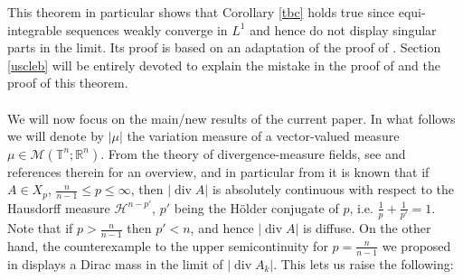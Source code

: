 \documentclass[10pt,reqno]{amsart}
\numberwithin{equation}{section}
\newcommand{\R}{\mathbb{R}}
\newcommand{\T}{\mathbb{T}}
\DeclareMathOperator{\dv}{div}
\theoremstyle{plain}
\theoremstyle{definition}
\theoremstyle{remark}
\begin{document}
This theorem in particular shows that Corollary \ref{tbc} holds true since equi-integrable sequences weakly converge in $L^1$ and hence do not display singular parts in the limit. Its proof is based on an adaptation of the proof of \cite[Thm. 2]{USC}.  Section \ref{uscleb} will be entirely devoted to explain the mistake in the proof of \cite[Cor. 7]{USC} and the proof of this theorem.
\\
\\
We will now focus on the main/new results of the current paper.  In what follows we will denote by $|\mu|$ the  variation measure of a vector-valued measure $\mu\in \mathcal{M}(\T^n;\R^n)$. From the theory of divergence-measure fields, see \cite{DMCT} and references therein for an overview, and in particular from \cite[Thm. 3.2]{Sil05} it is known that if $A\in X_p$, $\frac{n}{n-1}\leq p \le \infty$,  then $|\dv A|$ is absolutely continuous with respect to the Hausdorff measure $\mathcal{H}^{n-p'}$, $p'$ being the H\"older conjugate of $p$, i.e. $\frac{1}{p}+\frac{1}{p'}=1$. Note that if $p>\frac{n}{n-1}$ then $p'<n$, and hence $|\dv A|$ is diffuse. On the other hand, the counterexample to the upper semicontinuity for $p = \frac{n}{n-1}$ we proposed in \cite[Prop. 8]{USC} displays a Dirac mass in the limit of $| \dv A_k|$.   This lets us raise the following:
\end{document}
